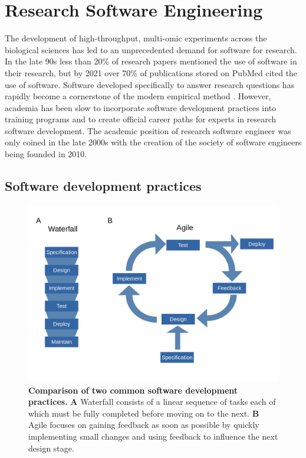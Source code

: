 \documentclass[../main.tex]{subfiles}
\begin{document}
\newpage

\section{Research Software Engineering}

The development of high-throughput, multi-omic experiments across the biological sciences has led to an unprecedented demand for software for research.
In the late 90s less than 20\% of research papers mentioned the use of software in their research, but by 2021 over 70\% of publications stored on PubMed cited the use of software.
Software developed specifically to answer research questions has rapidly become a cornerstone of the modern empirical method \parencite{Schindler2022}.
However, academia has been slow to incorporate software development practices into training programs and to create official career paths for experts in research software development.
The academic position of research software engineer was only coined in the late 2000s \parencite{Prause2010} with the creation of the society of software engineers being founded in 2010. 

\subsection{Software development practices}




\begin{figure}[h]

{\centering \includegraphics[width=\linewidth]{figures/agileVsWaterfall} 

}

\caption[Summary of Agile and Waterfall software development practices.]{\textbf{Comparison of two common software development practices.} \textbf{A} Waterfall consists of a linear sequence of tasks each of which must be fully completed before moving on to the next. \textbf{B} Agile focuses on gaining feedback as soon as possible by quickly implementing small changes and using feedback to influence the next design stage. }\label{fig:development-practices}
\end{figure}
\end{document}
